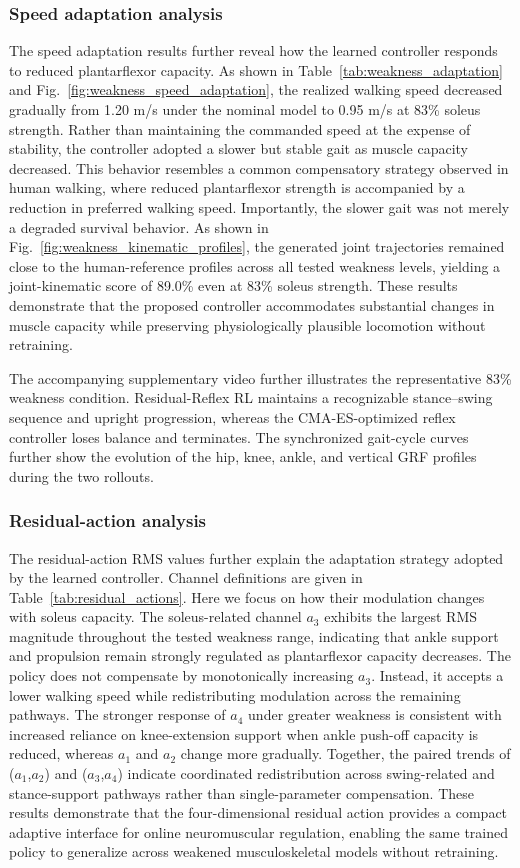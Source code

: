 \documentclass[manuscript,screen,review,anonymous]{acmart}
\newcommand{\suppvideo}{supplementary video}
\begin{document}
\subsubsection{Speed adaptation analysis}
The speed adaptation results further reveal how the learned controller responds to reduced plantarflexor capacity. As shown in
Table~\ref{tab:weakness_adaptation} and
Fig.~\ref{fig:weakness_speed_adaptation}, the realized walking speed decreased gradually from 1.20 m/s under the nominal model to 0.95 m/s at 83\% soleus strength. Rather than maintaining the commanded speed at the expense of stability, the controller adopted a slower but stable gait as muscle capacity decreased. This behavior resembles a common compensatory strategy observed in human walking, where reduced plantarflexor strength is accompanied by a reduction in preferred walking speed. Importantly, the slower gait was not merely a degraded survival behavior. As shown in Fig.~\ref{fig:weakness_kinematic_profiles}, the generated joint trajectories remained close to the human-reference profiles across all tested weakness levels, yielding a joint-kinematic score of 89.0\% even at 83\% soleus strength. These results demonstrate that the proposed controller accommodates substantial changes in muscle capacity while preserving physiologically plausible locomotion without retraining.

The accompanying \suppvideo{} further illustrates the representative 83\% weakness condition. Residual-Reflex RL maintains a recognizable stance--swing sequence and upright progression, whereas the CMA-ES-optimized reflex controller loses balance and terminates. The synchronized gait-cycle curves further show the evolution of the hip, knee, ankle, and vertical GRF profiles during the two rollouts.

\subsubsection{Residual-action analysis}
The residual-action RMS values further explain the adaptation strategy adopted by the learned controller. Channel definitions are given in Table~\ref{tab:residual_actions}. Here we focus on how their modulation changes with soleus capacity. The soleus-related channel $a_3$ exhibits the largest RMS magnitude throughout the tested weakness range, indicating that ankle support and propulsion remain strongly regulated as plantarflexor capacity decreases. The policy does not compensate by monotonically increasing $a_3$. Instead, it accepts a lower walking speed while redistributing modulation across the remaining pathways. The stronger response of $a_4$ under greater weakness is consistent with increased reliance on knee-extension support when ankle push-off capacity is reduced, whereas $a_1$ and $a_2$ change more gradually. Together, the paired trends of ($a_1$,$a_2$) and ($a_3$,$a_4$) indicate coordinated redistribution across swing-related and stance-support pathways rather than single-parameter compensation. These results demonstrate that the four-dimensional residual action provides a compact adaptive interface for online neuromuscular regulation, enabling the same trained policy to generalize across weakened musculoskeletal models without retraining.
\end{document}
